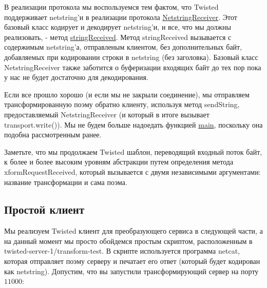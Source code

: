 
В реализации протокола мы воспользуемся тем 
фактом, что Twisted поддерживает netstring'и в 
реализации протокола 
\href{http://twistedmatrix.com/trac/browser/tags/releases/twisted-8.2.0/twisted/protocols/basic.py#L31}{NetstringReceiver}. Этот  
базовый класс кодирует и декодирует netstring'и, и 
все, что мы должны реализовать, - метод 
\href{http://twistedmatrix.com/trac/browser/tags/releases/twisted-8.2.0/twisted/protocols/basic.py#L49}{stringReceived}. 
Метод stringReceived вызывается с содержимым 
netstring'а, отправленым клиентом, без дополнительных 
байт, добавляемых при кодировании строки в netstring (без заголовка). 
Базовый класс NetstringReceiver также заботится о буферизации входящих 
байт до тех пор пока у нас не будет достаточно для декодирования.


Если все прошло хорошо (и если мы не закрыли соединение), 
мы отправляем трансформированную поэму обратно клиенту, 
используя метод sendString, предоставляемый 
NetstringReceiver (и который в итоге вызывает transport.write()). 
Мы не будем больше надоедать функцией 
\href{http://github.com/jdavisp3/twisted-intro/blob/master/twisted-server-1/tranformedpoetry.py#L89}{main}, поскольку она подобна рассмотренным ранее.


Заметьте, что мы продолжаем
Twisted шаблон, переводящий входный 
поток байт, к более и более высоким 
уровням абстракции путем определения метода 
xformRequestReceived, который вызывается с двумя независимыми 
аргументами: название трансформации и сама поэма.


\subsection{Простой клиент}


Мы реализуем Twisted клиент для преобразующего 
сервиса в следующей части, а на данный момент мы 
просто обойдемся простым скриптом, расположенным в twisted-server-1/transform-test.
В скрипте используется программа netcat, 
которая отправляет поэму серверу и печатает его ответ (который 
будет кодирован как netstring). Допустим, что вы запустили 
трансформирующий сервер на порту $11000$:

